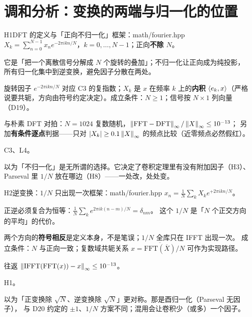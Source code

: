 \section{调和分析：变换的两端与归一化的位置}

\begin{know}{H1}{DFT 的定义与「正向不归一化」}{框架：math/fourier.hpp}
 $X_k=\sum_{n=0}^{N-1}x_n e^{-2\pi ikn/N}$，$k=0,\dots,N-1$；正向\textbf{不除 $N$}。

 它是「把一个离散信号分解成 $N$ 个旋转的叠加」；不归一化让正向成为纯投影，
所有归一化集中到逆变换，避免因子分散在两处。

 旋转因子 $e^{-2\pi ikn/N}$ 对应 C3 的复指数；$X_k$ 是 $x$ 在频率 $k$ 上的\textbf{内积}
$\langle e_k,x\rangle$（严格说要共轭，方向由符号约定决定）。成立条件：$N\ge1$；信号按 $N\times1$ 列向量（D19）。

 与朴素 DFT 对拍：$N=1024$ 复数随机，$\left\lVert \mathrm{FFT}-\mathrm{DFT}\right\rVert_{\infty}/\left\lVert X\right\rVert_{\infty}\le10^{-13}$；
另加\textbf{有条件逐点}判据——只对 $\left\lvert X_k\right\rvert\ge0.1\left\lVert X\right\rVert_{\infty}$ 的频点比较（近零频点必然假红）。

 C3、L4。

 以为「不归一化」是无所谓的选择。它决定了卷积定理里有没有附加因子（H3）、
Parseval 里 $1/N$ 放在哪边（H8）——一处改，处处变。
\end{know}

\begin{know}{H2}{逆变换：$1/N$ 只出现一次}{框架：math/fourier.hpp}
 $x_n=\frac1N\sum_k X_k e^{+2\pi ikn/N}$。

 正逆必须复合为恒等：$\frac1N\sum_k e^{2\pi ik(n-m)/N}=\delta_{nm}$。
这个 $1/N$ 是「$N$ 个正交方向的平均」的代价。

 两个方向的\textbf{符号相反}是定义本身，不是笔误；$1/N$ 全库只在 IFFT 出现一次。
成立条件：$N$ 与正向一致；复数域共轭关系 $x=\overline{\mathrm{FFT}(\overline{X})}/N$ 可作为实现路径。

 往返 $\left\lVert \mathrm{IFFT}(\mathrm{FFT}(x))-x\right\rVert_{\infty}\le10^{-13}$。

 H1。

 以为「正变换除 $\sqrt N$、逆变换除 $\sqrt N$」更对称。那是酉归一化（Parseval 无因子），
与 D20 约定的 $\pm1$、$1/N$ 方案不同；混用会让卷积少（或多）一个因子。
\end{know}

